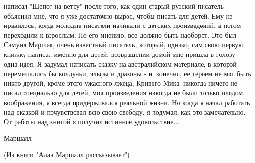  написал "Шепот на ветру" после того, как один старый русский 
писатель объяснил мне, что я уже достаточно вырос, чтобы писать для 
детей. Ему не нравилось, когда молодые писатели начинали с детских 
произведений, а потом переходили к взрослым. По его мнению, все должно 
быть наоборот. Это был Самуил Маршак, очень известный писатель, 
который, однако, сам свою первую книжку написал именно для детей.
 возвращении домой мне пришла в голову одна идея. Я задумал 
написать сказку на австралийском материале, в которой перемешались бы 
колдуньи, эльфы и драконы - и, конечно, ее героем не мог быть никто 
другой, кроме этого ужасного лжеца, Кривого Мика.
 никогда ничего не писал специально для детей, мои произведения 
никогда не были только плодом воображения, я всегда придерживался 
реальной жизни. Но когда я начал работать над сказкой и почувствовал 
всю свою свободу, я подумал, как это замечательно. От работы над 
книгой я получил истинное удовольствие...
\par{} Маршалл
\par(Из книги "Алан Маршалл рассказывает")
